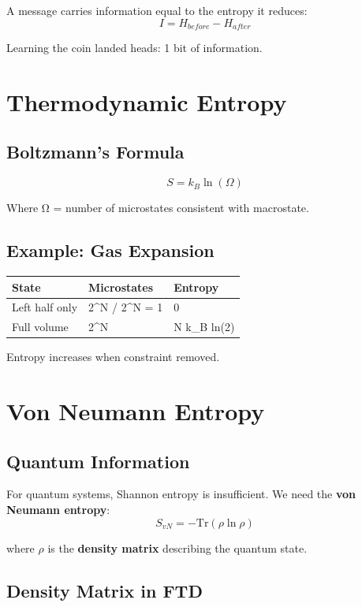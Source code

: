 \documentclass[
  11pt,
  letterpaper,
  twoside,
  openright]{book}
\begin{document}
A message carries information equal to the entropy it reduces: \[
I = H_{before} - H_{after}
\]

Learning the coin landed heads: 1 bit of information.

\section{Thermodynamic Entropy}\label{thermodynamic-entropy}

\subsection{Boltzmann's Formula}\label{boltzmanns-formula}

\[
S = k_B \ln(\Omega)
\]

Where Ω = number of microstates consistent with macrostate.

\subsection{Example: Gas Expansion}\label{example-gas-expansion}

\begin{longtable}[]{@{}lll@{}}
\toprule\noalign{}
State & Microstates & Entropy \\
\midrule\noalign{}
\endhead
\bottomrule\noalign{}
\endlastfoot
Left half only & 2\^{}N / 2\^{}N = 1 & 0 \\
Full volume & 2\^{}N & N k\_B ln(2) \\
\end{longtable}

Entropy increases when constraint removed.

\section{Von Neumann Entropy}\label{von-neumann-entropy}

\subsection{Quantum Information}\label{quantum-information}

For quantum systems, Shannon entropy is insufficient. We need the
\textbf{von Neumann entropy}: \[
S_{vN} = -\text{Tr}(\rho \ln \rho)
\]

where \(\rho\) is the \textbf{density matrix} describing the quantum
state.

\subsection{Density Matrix in FTD}\label{density-matrix-in-ftd}
\end{document}

